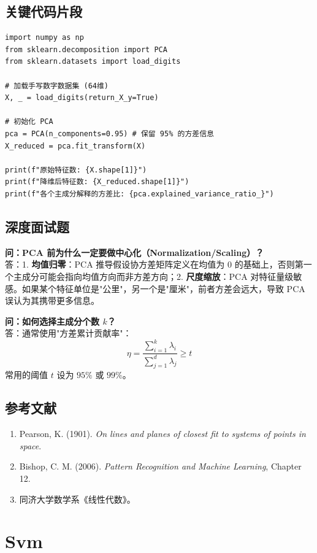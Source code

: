 \documentclass[12pt, a4paper]{book}
\begin{document}
\section{关键代码片段}
\begin{lstlisting}
import numpy as np
from sklearn.decomposition import PCA
from sklearn.datasets import load_digits

# 加载手写数字数据集 (64维)
X, _ = load_digits(return_X_y=True)

# 初始化 PCA
pca = PCA(n_components=0.95) # 保留 95% 的方差信息
X_reduced = pca.fit_transform(X)

print(f"原始特征数: {X.shape[1]}")
print(f"降维后特征数: {X_reduced.shape[1]}")
print(f"各个主成分解释的方差比: {pca.explained_variance_ratio_}")
\end{lstlisting}

\section{深度面试题}

\textbf{问：PCA 前为什么一定要做中心化（Normalization/Scaling）？}\\
答：1. \textbf{均值归零}：PCA 推导假设协方差矩阵定义在均值为 0 的基础上，否则第一个主成分可能会指向均值方向而非方差方向；2. \textbf{尺度缩放}：PCA 对特征量级敏感。如果某个特征单位是"公里"，另一个是"厘米"，前者方差会远大，导致 PCA 误认为其携带更多信息。

\textbf{问：如何选择主成分个数 $k$？}\\
答：通常使用"方差累计贡献率"：
$$ \eta = \frac{\sum_{i=1}^k \lambda_i}{\sum_{j=1}^d \lambda_j} \geq t $$
常用的阈值 $t$ 设为 $95\%$ 或 $99\%$。

\section{参考文献}
\begin{enumerate}
    \item Pearson, K. (1901). \textit{On lines and planes of closest fit to systems of points in space}.
    \item Bishop, C. M. (2006). \textit{Pattern Recognition and Machine Learning}, Chapter 12.
    \item 同济大学数学系《线性代数》。
\end{enumerate}

\chapter{Svm}
\end{document}
